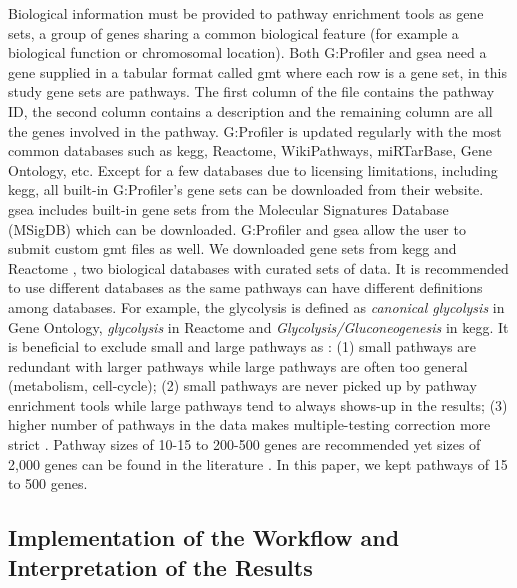 Biological information must be provided to pathway enrichment tools as gene sets, a group of genes sharing a common biological feature (for example a biological function or chromosomal location).
Both G:Profiler and \acrshort{gsea} need a gene supplied in a tabular format called \acrfull{gmt} where each row is a gene set, in this study gene sets are pathways.
The first column of the file contains the pathway ID, the second column contains a description and the remaining column are all the genes involved in the pathway.
G:Profiler is updated regularly with the most common databases such as \acrshort{kegg}, Reactome, WikiPathways, miRTarBase, Gene Ontology, etc.
Except for a few databases due to licensing limitations, including \acrshort{kegg}, all built-in G:Profiler's gene sets can be downloaded from their website.
\acrshort{gsea} includes built-in gene sets from the Molecular Signatures Database (MSigDB) which can be downloaded.
G:Profiler and \acrshort{gsea} allow the user to submit custom \acrshort{gmt} files as well.
We downloaded gene sets from \acrshort{kegg} \cite*{Kanehisa2019} and Reactome \cite*{Gillespie2022}, two biological databases with curated sets of data.
It is recommended to use different databases as the same pathways can have different definitions among databases.
For example, the glycolysis is defined as \textit{canonical glycolysis} in Gene Ontology, \textit{glycolysis} in Reactome and \textit{Glycolysis/Gluconeogenesis} in \acrshort{kegg}.
It is beneficial to exclude small and large pathways as : (1) small pathways are redundant with larger pathways while large pathways are often too general (metabolism, cell-cycle); (2) small pathways are never picked up by pathway enrichment tools while large pathways tend to always shows-up in the results; (3) higher number of pathways in the data makes multiple-testing correction more strict \cite*{Reimand2019}.
Pathway sizes of 10-15 to 200-500 genes are recommended yet sizes of 2,000 genes can be found in the literature \cite*{Reimand2019}.
In this paper, we kept pathways of 15 to 500 genes.

\subsection{Implementation of the Workflow and Interpretation of the Results}

